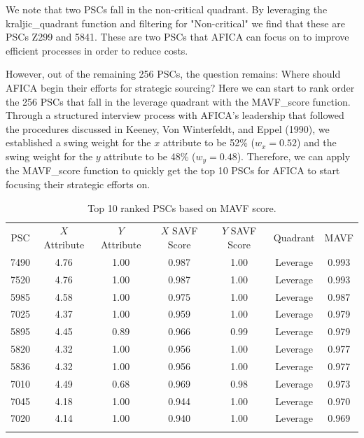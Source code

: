 \documentclass[twocolumn]{svjour3}       %
\begin{document}
We note that two PSCs fall in the non-critical quadrant.  By leveraging the kraljic\_quadrant function and filtering for "Non-critical" we find that these are PSCs Z299 and 5841.  These are two PSCs that AFICA can focus on to improve efficient processes in order to reduce costs.

However, out of the remaining 256 PSCs, the question remains: Where should AFICA begin their efforts for strategic sourcing?  Here we can start to rank order the 256 PSCs that fall in the leverage quadrant with the MAVF\_score function.  Through a structured interview process with AFICA's leadership that followed the procedures discussed in Keeney, Von Winterfeldt, and Eppel (1990), we established a swing weight for the $x$ attribute to be 52\% ($w_x = 0.52$) and the swing weight for the $y$ attribute to be 48\% ($w_y = 0.48$).  Therefore, we can apply the MAVF\_score function to quickly get the top 10 PSCs for AFICA to start focusing their strategic efforts on.  

\begin{table}[!htb]
  \centering
  \caption{Top 10 ranked PSCs based on MAVF score.}
  \label{tab:2}       %
  \begin{tabular}{ccccccc}
    \hline\noalign{\smallskip}
    PSC &	$X$ Attribute	& $Y$ Attribute	& $X$ SAVF Score & $Y$ SAVF Score	& Quadrant &	MAVF \\
    \noalign{\smallskip}\hline\noalign{\smallskip}
    7490 & 4.76 &	1.00 &	0.987 &	1.00 &	Leverage &	0.993 \\
    7520 & 4.76 &	1.00 &	0.987 &	1.00 &	Leverage &	0.993 \\
    5985 & 4.58 &	1.00 &	0.975 &	1.00 &	Leverage &	0.987 \\
    7025 &	4.37 &	1.00 &	0.959 &	1.00 &	Leverage &	0.979 \\
    5895 &	4.45 &	0.89 &	0.966 &	0.99 &	Leverage &	0.979 \\
    5820 &	4.32 &	1.00 &	0.956 &	1.00 &	Leverage &	0.977 \\
    5836 &	4.32 &	1.00 &	0.956 &	1.00 &	Leverage &	0.977 \\
    7010 &	4.49 &	0.68 &	0.969 &	0.98 &	Leverage &	0.973 \\ 
    7045 &	4.18 &	1.00 &	0.944 &	1.00 &	Leverage &	0.970 \\
    7020 &	4.14 &	1.00 &	0.940 &	1.00 &	Leverage &	0.969 \\
    \noalign{\smallskip}\hline
  \end{tabular}
\end{table}
\end{document}
